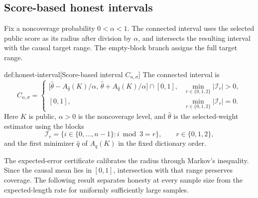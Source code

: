 \documentclass[11pt]{article}
\begin{document}
\subsection{Score-based honest intervals}

Fix a noncoverage probability \(0<\alpha<1\). The connected interval  uses the selected public score as its radius after division by \(\alpha\), and intersects the resulting interval with the causal target range. The empty-block branch assigns the full target range.

\begin{definitionv}{def:honest-interval}[Score-based interval \(C_{n,\sigma}\)]
The connected interval is
\[
C_{n,\sigma}
=
\begin{cases}
\bigl[\widehat\theta-A_{\widehat q}(K)/\alpha,\,
      \widehat\theta+A_{\widehat q}(K)/\alpha\bigr]\cap[0,1],
      &\min_{r\in\{0,1,2\}}|\mathcal I_r|>0,\\
[0,1],&\min_{r\in\{0,1,2\}}|\mathcal I_r|=0.
\end{cases}
\]
Here \(K\) is public, \(\alpha>0\) is the noncoverage level, and \(\widehat\theta\) is the selected-weight estimator using the blocks
\[
\mathcal I_r
=\{i\in\{0,\ldots,n-1\}:i\bmod 3=r\},
\qquad r\in\{0,1,2\},
\]
and the first minimizer \(\widehat q\) of \(A_q(K)\) in the fixed dictionary order.
\end{definitionv}

The expected-error certificate calibrates the radius through Markov's inequality. Since the causal mean lies in \([0,1]\), intersection with that range preserves coverage. The following result separates honesty at every sample size from the expected-length rate for uniformly sufficiently large samples.
\end{document}
